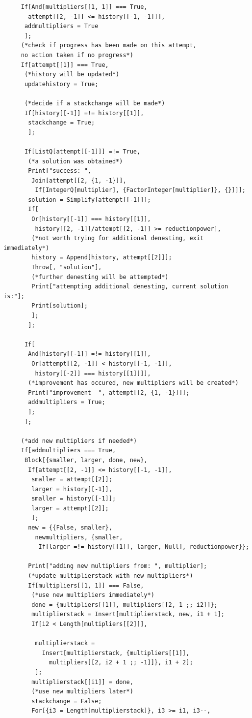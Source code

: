 \documentclass[11pt,letterpaper]{article}
\theoremstyle{definition}
\theoremstyle{remark}
\begin{document}
\begin{lstlisting}
     If[And[multipliers[[1, 1]] === True, 
       attempt[[2, -1]] <= history[[-1, -1]]],
      addmultipliers = True
      ];
     (*check if progress has been made on this attempt, 
     no action taken if no progress*)
     If[attempt[[1]] === True,
      (*history will be updated*)
      updatehistory = True;
      
      (*decide if a stackchange will be made*)
      If[history[[-1]] =!= history[[1]],
       stackchange = True;
       ];
      
      If[ListQ[attempt[[-1]]] =!= True,
       (*a solution was obtained*)
       Print["success: ", 
        Join[attempt[[2, {1, -1}]], 
         If[IntegerQ[multiplier], {FactorInteger[multiplier]}, {}]]];
       solution = Simplify[attempt[[-1]]];
       If[
        Or[history[[-1]] === history[[1]], 
         history[[2, -1]]/attempt[[2, -1]] >= reductionpower],
        (*not worth trying for additional denesting, exit immediately*)
        history = Append[history, attempt[[2]]];
        Throw[, "solution"],
        (*further denesting will be attempted*)
        Print["attempting additional denesting, current solution is:"];
        Print[solution];
        ];
       ];
      
      If[
       And[history[[-1]] =!= history[[1]], 
        Or[attempt[[2, -1]] < history[[-1, -1]], 
         history[[-2]] === history[[1]]]],
       (*improvement has occured, new multipliers will be created*)
       Print["improvement  ", attempt[[2, {1, -1}]]];
       addmultipliers = True;
       ];
      ];
     
     (*add new multipliers if needed*)
     If[addmultipliers === True,
      Block[{smaller, larger, done, new},
       If[attempt[[2, -1]] <= history[[-1, -1]],
        smaller = attempt[[2]];
        larger = history[[-1]],
        smaller = history[[-1]];
        larger = attempt[[2]];
        ];
       new = {{False, smaller}, 
         newmultipliers, {smaller, 
          If[larger =!= history[[1]], larger, Null], reductionpower}};
       
       Print["adding new multipliers from: ", multiplier];
       (*update multiplierstack with new multipliers*)
       If[multipliers[[1, 1]] === False,
        (*use new multipliers immediately*)
        done = {multipliers[[1]], multipliers[[2, 1 ;; i2]]};
        multiplierstack = Insert[multiplierstack, new, i1 + 1];
        If[i2 < Length[multipliers[[2]]],
         
         multiplierstack = 
           Insert[multiplierstack, {multipliers[[1]], 
             multipliers[[2, i2 + 1 ;; -1]]}, i1 + 2];
         ];
        multiplierstack[[i1]] = done,
        (*use new multipliers later*)
        stackchange = False;
        For[{i3 = Length[multiplierstack]}, i3 >= i1, i3--,
         

\end{lstlisting}
\end{document}
